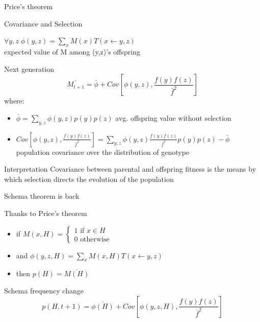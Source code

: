 \begin{frame}{Price's theorem}
  \begin{block}{Covariance and Selection}
    \begin{center}
      $\forall y,z \; \phi(y,z) = \sum\limits_{x} M(x)T(x \leftarrow y,z)$\\ expected value of M among (y,z)'s offspring
      \end{center}
  \end{block}

  \begin{block}{Next generation}
    $$\bar{M_{t+1}} = \bar{\phi}
    + Cov[\phi(y,z), \frac{f(y)f(z)}{\bar{f}^2}]$$
    where:
    \begin{itemize}
    \item $\bar{\phi} = \sum\limits_{y,z} \phi(y,z)p(y)p(z)$ avg. offspring value without selection
    \item $Cov[\phi(y,z), \frac{f(y)f(z)}{\bar{f}^2}] =
      \sum\limits_{y,z} \phi(y,z) \frac{f(y)f(z)}{\bar{f}^2}p(y)p(z) -
      \bar{\phi}$ population covariance over the distribution of genotype
    \end{itemize}
  \end{block}

  \begin{block}{Interpretation}
    Covariance between parental and offspring fitness is the means by which selection directs the evolution of the population
  \end{block}
\end{frame}

\begin{frame}{Schema theorem is back}
  \begin{block}{Thanks to Price's theorem}
    \begin{itemize}
      \item if $M(x, H) = \left\{\begin{array}{l}
        1 \text{ if } x \in H\\
        0 \text{ otherwise}
        \end{array}
        \right .$
      \item and $\phi(y,z,H) = \sum\limits_{x} M(x,H)T(x \leftarrow y,z)$
      \item then $p(H) = \bar{M(H)}$
    \end{itemize}
  \end{block}

  \begin{block}{Schema frequency change\cite{Altenberg95}}
    $$p(H,t+1) = \bar{\phi(H)} + Cov[\phi(y,z,H), \frac{f(y)f(z)}{\bar{f}^2}]$$
  \end{block}

\end{frame}

